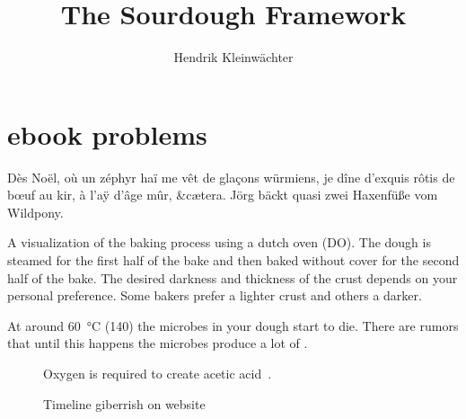 \documentclass[paper=a4, twoside=false, fontsize=12pt, parskip=half,
                bibliography=totoc, listof=totoc]{scrbook}
\author{Hendrik Kleinwächter}
\title{The Sourdough Framework}
\begin{document}

\titlepage

{%
\hypersetup{hidelinks}
\ifdefined\HCode\else\tableofcontents\fi
}

\chapter{ebook problems}
Dès Noël, où un zéphyr haï me vêt de glaçons würmiens, je dîne d’exquis rôtis
de bœuf au kir, à l’aÿ d’âge mûr, \&cætera.
Jörg bäckt quasi zwei Haxenfüße vom Wildpony.

\begin{flowchart}[!htb]
\begin{center}
  
  \caption[Baking process with a dutch oven]{A visualization of the baking
      process using a dutch oven (DO). The dough is steamed for the first half
      of the bake and then baked without cover for the second half of the
      bake. The desired darkness and thickness of the crust depends on your
      personal preference. Some bakers prefer a lighter crust and others a
      darker.}%
  \label{fig:dutch-oven-process}
\end{center}
\end{flowchart}

At around  \qty{60}{\degreeCelsius} (\qty{140}{\degF}) the microbes in your
dough start to die.  There are rumors that until this happens the microbes
produce a lot of .

\begin{figure}[!htb]
\begin{center}
  
  \caption[Acetic acid creation]{Oxygen is required to create acetic
      acid~\cite{acetic+acid+production}.}%
  \label{fig:ethanol-oxidation}
\end{center}

\end{figure}

\begin{figure}[!htb]
\begin{center}
  
  \caption[Sourdough microbiology timeline]{Timeline giberrish on website}%
\end{center}
\end{figure}
\end{document}
